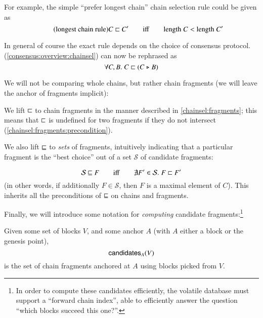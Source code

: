 For example, the simple ``prefer longest chain'' chain selection rule could be
given as
%
\begin{equation*}
\tag{longest chain rule}
C \mathrel{\sqsubset} C'  \qquad\mathrm{iff}\qquad  \mathrm{length} \; C < \mathrm{length} \; C'
\end{equation*}

In general of course the exact rule depends on the choice of consensus protocol.
 (\cref{consensus:overview:chainsel}) can now be
rephrased as
%
\begin{equation}
\label{eq:prefer-extension}
\forall C, B .\; C \mathrel{\sqsubset} (C \mathrel{\triangleright} B)
\end{equation}

We will not be comparing whole chains, but rather chain fragments
(we will leave the anchor of fragments implicit):
%
\begin{definition}
We lift $\mathrel{\sqsubset}$ to chain fragments in the manner described in
\cref{chainsel:fragments}; this means that $\mathrel{\sqsubset}$ is undefined for two
fragments if they do not intersect (\cref{chainsel:fragments:precondition}).
\end{definition}

We also lift $\mathrel{\sqsubseteq}$ to \emph{sets} of fragments, intuitively indicating that
a particular fragment is the ``best choice'' out of a set $\mathcal{S}$ of
candidate fragments:
%
\begin{definition}
\begin{equation*}
\mathcal{S} \mathrel{\sqsubseteq} F  \qquad\mathrm{iff}\qquad   \nexists F' \in \mathcal{S} .\; F \mathrel{\sqsubset} F'
\end{equation*}
(in other words, if additionally $F \in \mathcal{S}$, then $F$ is a maximal
element of $C$). This inherits all the preconditions of $\mathrel{\sqsubseteq}$ on chains and
fragments.
\end{definition}

Finally, we will introduce some notation for \emph{computing} candidate
fragments:\footnote{In order to compute these candidates efficiently, the
volatile database must support a ``forward chain index'', able to efficiently
answer the question ``which blocks succeed this one?''.}

\begin{definition}
Given some set of blocks $V$, and some anchor $A$ (with $A$ either a block or
the genesis point), $$\mathsf{candidates}_A(V)$$ is the set of chain fragments
anchored at $A$ using blocks picked from $V$.
\end{definition}

